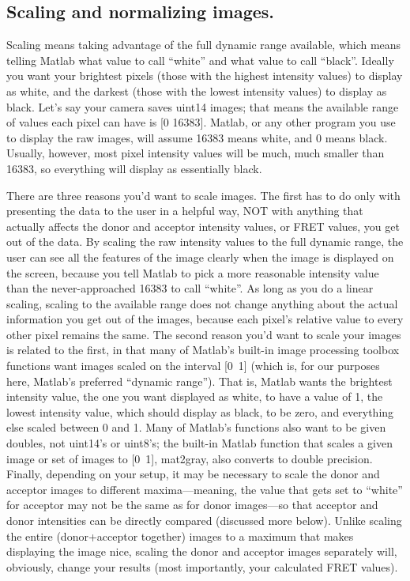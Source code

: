 \documentclass[11pt]{article}
\begin{document}
\subsection{Scaling and normalizing images.} \label{sec:ScalingExplain}

Scaling means taking advantage of the full dynamic range available, which means telling Matlab what value to call ``white'' and what value to call ``black''. Ideally you want your brightest pixels (those with the highest intensity values) to display as white, and the darkest (those with the lowest intensity values) to display as black.  Let's say your camera saves uint14 images; that means the available range of values each pixel can have is [0 16383].  Matlab, or any other program you use to display the raw images, will assume 16383 means white, and 0 means black.  Usually, however, most pixel intensity values will be much, much smaller than 16383, so everything will display as essentially black.

There are three reasons you'd want to scale images.  The first has to do only with presenting the data to the user in a helpful way, NOT with anything that actually affects the donor and acceptor intensity values, or FRET values, you get out of the data.  By scaling the raw intensity values to the full dynamic range, the user can see all the features of the image clearly when the image is displayed on the screen, because you tell Matlab to pick a more reasonable intensity value than the never-approached 16383 to call ``white''.  As long as you do a linear scaling, scaling to the available range does not change anything about the actual information you get out of the images, because each pixel's relative value to every other pixel remains the same.  The second reason you'd want to scale your images is related to the first, in that many of Matlab's built-in image processing toolbox functions want images scaled on the interval [0~1] (which is, for our purposes here, Matlab's preferred ``dynamic range'').  That is, Matlab wants the brightest intensity value, the one you want displayed as white, to have a value of 1, the lowest intensity value, which should display as black, to be zero, and everything else scaled between 0 and 1. Many of Matlab's functions also want to be given doubles, not uint14's or uint8's; the built-in Matlab function that scales a given image or set of images to [0~1], mat2gray, also converts to double precision.  Finally, depending on your setup, it may be necessary to scale the donor and acceptor images to different maxima---meaning, the value that gets set to ``white'' for acceptor may not be the same as for donor images---so that acceptor and donor intensities can be directly compared (discussed more below).  Unlike scaling the entire (donor+acceptor together) images to a maximum that makes displaying the image nice, scaling the donor and acceptor images separately will, obviously, change your results (most importantly, your calculated FRET values).
\end{document}
